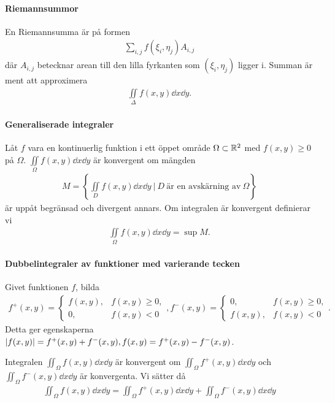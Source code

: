 \paragraph{Riemannsummor}
En Riemannsumma är på formen
\begin{align*}
	\sum_{i, j}f(\xi_i, \eta_j)A_{i, j}
\end{align*}
där $A_{i, j}$ betecknar arean till den lilla fyrkanten som $(\xi_i, \eta_j)$ ligger i. Summan är ment att approximera
\begin{align*}
	\iint\limits_{\Delta}f(x, y)\dd{x}\dd{y}.
\end{align*}

\paragraph{Generaliserade integraler}
Låt $f$ vara en kontinuerlig funktion i ett öppet område $\Omega\subset\mathbb{R}^2$ med $f(x, y)\geq 0$ på $\Omega$. $\iint\limits_{\Omega}f(x, y)\dd{x}\dd{y}$ är konvergent om mängden
\begin{align*}
	M = \left\{\iint\limits_{D}f(x, y)\dd{x}\dd{y}\ |\ D~\text{är en avskärning av}~\Omega\right\}
\end{align*}
är uppåt begränsad och divergent annars. Om integralen är konvergent definierar vi
\begin{align*}
	\iint\limits_{\Omega}f(x, y)\dd{x}\dd{y} = \sup{M}.
\end{align*}

\paragraph{Dubbelintegraler av funktioner med varierande tecken}
Givet funktionen $f$, bilda
\begin{align*}
	f^+(x, y) =
	\begin{cases}
		f(x, y), &f(x, y)\geq 0, \\
		0,       &f(x, y)< 0
	\end{cases},
	f^-(x, y) =
	\begin{cases}
		0,       &f(x, y)\geq 0, \\
		f(x, y), &f(x, y)< 0
	\end{cases}.
\end{align*}
Detta ger egenskaperna $\abs{f(x, y)} = f^+(x, y) + f^-(x, y), f(x, y) = f^+(x, y) - f^-(x, y)$.

Integralen $\iint_{\Omega}f(x, y)\dd{x}\dd{y}$ är konvergent om $\iint_{\Omega}f^+(x, y)\dd{x}\dd{y}$ och $\iint_{\Omega}f^-(x, y)\dd{x}\dd{y}$ är konvergenta. Vi sätter då
\begin{align*}
	\iint_{\Omega}f(x, y)\dd{x}\dd{y} = \iint_{\Omega}f^+(x, y)\dd{x}\dd{y}+ \iint_{\Omega}f^-(x, y)\dd{x}\dd{y}
\end{align*}

